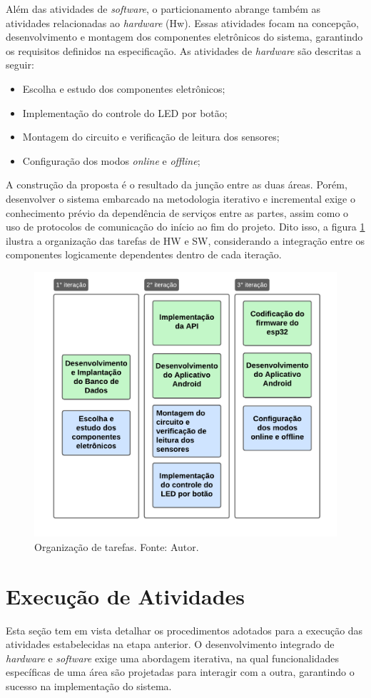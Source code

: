 Além das atividades de \textit{software}, o particionamento abrange também as atividades relacionadas ao \textit{hardware} (Hw). Essas atividades focam na concepção, desenvolvimento e montagem dos componentes 
eletrônicos do sistema, garantindo os requisitos definidos na especificação. As atividades de \textit{hardware} são descritas a seguir:

\begin{itemize}
    \item Escolha e estudo dos componentes eletrônicos;
    \item Implementação do controle do LED por botão;
    \item Montagem do circuito e verificação de leitura dos sensores;
    \item Configuração dos modos \textit{online} e \textit{offline};
\end{itemize}

A construção da proposta é o resultado da junção entre as duas áreas. Porém, desenvolver o sistema embarcado 
na metodologia iterativo e incremental exige o conhecimento prévio da dependência de serviços entre as partes, assim como o uso de protocolos 
de comunicação do início ao fim do projeto. Dito isso, a figura \ref{figTarefasMetodologia} ilustra a organização das tarefas de HW e SW, considerando 
a integração entre os componentes logicamente dependentes dentro de cada iteração.

\begin{figure}[ht]
    \centering
    \includegraphics[width=.44\textwidth]{img/tarefas-metodologia.png}
    \caption{Organização de tarefas. Fonte: Autor.}\label{figTarefasMetodologia}
\end{figure}

\section{Execução de Atividades}\label{fase4}

Esta seção tem em vista detalhar os procedimentos adotados para a execução das atividades estabelecidas na etapa anterior. O desenvolvimento 
integrado de \textit{hardware} e \textit{software} exige uma abordagem iterativa, na qual funcionalidades específicas de uma área são projetadas para interagir com 
a outra, garantindo o sucesso na implementação do sistema.

